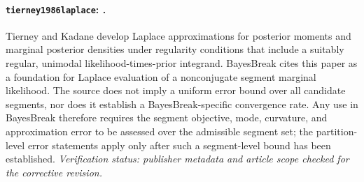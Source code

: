 \paragraph{\texttt{tierney1986laplace}: \citet{tierney1986laplace}.}
Tierney and Kadane develop Laplace approximations for posterior moments and marginal posterior densities under regularity conditions that include a suitably regular, unimodal likelihood-times-prior integrand. BayesBreak cites this paper as a foundation for Laplace evaluation of a nonconjugate segment marginal likelihood. The source does not imply a uniform error bound over all candidate segments, nor does it establish a BayesBreak-specific convergence rate. Any use in BayesBreak therefore requires the segment objective, mode, curvature, and approximation error to be assessed over the admissible segment set; the partition-level error statements apply only after such a segment-level bound has been established. \textit{Verification status: publisher metadata and article scope checked for the corrective revision.}
